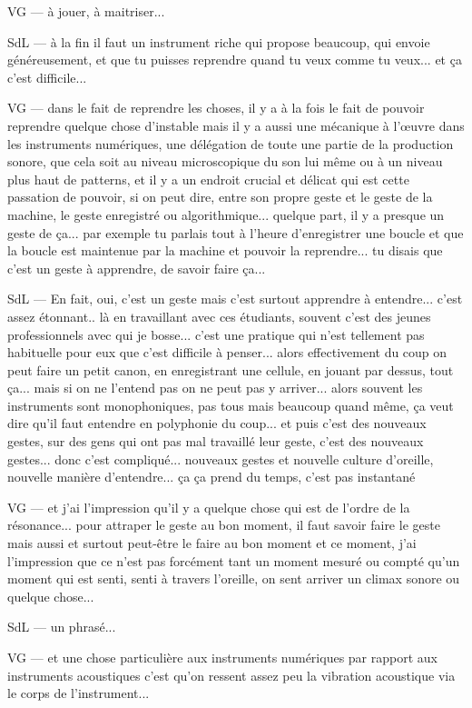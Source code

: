 VG — à jouer, à maitriser... 

SdL — à la fin il faut un instrument riche qui propose beaucoup, qui envoie généreusement, et que tu puisses reprendre quand tu veux comme tu veux... et ça c'est difficile... 

VG — dans le fait de reprendre les choses, il y a à la fois le fait de pouvoir reprendre quelque chose d'instable mais il y a aussi une mécanique à l'œuvre dans les instruments numériques, une délégation de toute une partie de la production sonore, que cela soit au niveau microscopique du son lui même ou à un niveau plus haut de patterns, et il y a un endroit crucial et délicat qui est cette passation de pouvoir, si on peut dire, entre son propre geste et le geste de la machine, le geste enregistré ou algorithmique... quelque part, il y a presque un geste de ça... par exemple tu parlais tout à l'heure d'enregistrer une boucle et que la boucle est maintenue par la machine et pouvoir la reprendre... tu disais que c'est un geste à apprendre, de savoir faire ça... 

SdL — En fait, oui, c'est un geste mais c'est surtout apprendre à entendre... c'est assez étonnant.. là en travaillant avec ces étudiants, souvent c'est des jeunes professionnels avec qui je bosse... c'est une pratique qui n'est tellement pas habituelle pour eux que c'est difficile à penser... alors effectivement du coup on peut faire un petit canon, en enregistrant une cellule, en jouant par dessus, tout ça... mais si on ne l'entend pas on ne peut pas y arriver... alors souvent les instruments sont monophoniques, pas tous mais beaucoup quand même, ça veut dire qu'il faut entendre en polyphonie du coup... et puis c'est des nouveaux gestes, sur des gens qui ont pas mal travaillé leur geste, c'est des nouveaux gestes... donc c'est compliqué... nouveaux gestes et nouvelle culture d'oreille, nouvelle manière d'entendre... ça ça prend du temps, c'est pas instantané  

VG — et j'ai l'impression qu'il y a quelque chose qui est de l'ordre de la résonance... pour attraper le geste au bon moment, il faut savoir faire le geste mais aussi et surtout peut-être le faire au bon moment et ce moment, j'ai l'impression que ce n'est pas forcément tant un moment mesuré ou compté qu'un moment qui est senti, senti à travers l'oreille, on sent arriver un climax sonore ou quelque chose... 

SdL — un phrasé... 

VG — et une chose particulière aux instruments numériques par rapport aux instruments acoustiques c'est qu'on ressent assez peu la vibration acoustique via le corps de l'instrument... 

